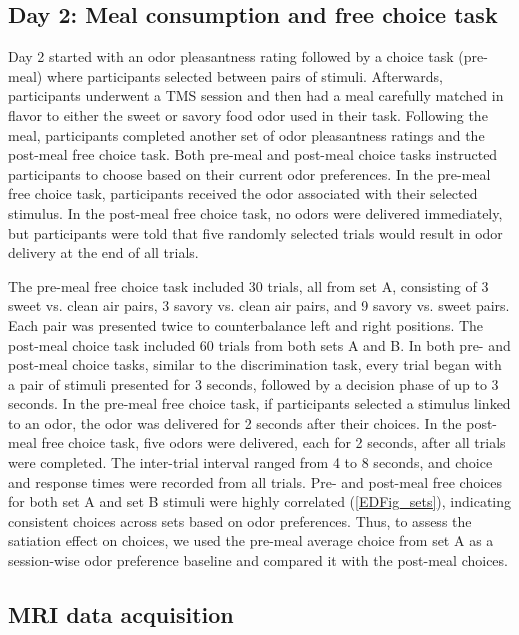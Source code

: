 \documentclass[lineno,sn-basic]{sn-jnl}%
\begin{document}
\subsection{Day 2: Meal consumption and free choice task} 
\label{day-2-meal-and-choice}

Day 2 started with an odor pleasantness rating followed by a choice task (pre-meal) where participants selected between pairs of stimuli. Afterwards, participants underwent a TMS session and then had a meal carefully matched in flavor to either the sweet or savory food odor used in their task. Following the meal, participants completed another set of odor pleasantness ratings and the post-meal free choice task. Both pre-meal and post-meal choice tasks instructed participants to choose based on their current odor preferences. In the pre-meal free choice task, participants received the odor associated with their selected stimulus. In the post-meal free choice task, no odors were delivered immediately, but participants were told that five randomly selected trials would result in odor delivery at the end of all trials.

The pre-meal free choice task included 30 trials, all from set A, consisting of 3 sweet vs. clean air pairs, 3 savory vs. clean air pairs, and 9 savory vs. sweet pairs. Each pair was presented twice to counterbalance left and right positions. The post-meal choice task included 60 trials from both sets A and B. In both pre- and post-meal choice tasks, similar to the discrimination task, every trial began with a pair of stimuli presented for 3 seconds, followed by a decision phase of up to 3 seconds. In the pre-meal free choice task, if participants selected a stimulus linked to an odor, the odor was delivered for 2 seconds after their choices. In the post-meal free choice task, five odors were delivered, each for 2 seconds, after all trials were completed. The inter-trial interval ranged from 4 to 8 seconds, and choice and response times were recorded from all trials. Pre- and post-meal free choices for both set A and set B stimuli were highly correlated (\ref{EDFig_sets}), indicating consistent choices across sets based on odor preferences. Thus, to assess the satiation effect on choices, we used the pre-meal average choice from set A as a session-wise odor preference baseline and compared it with the post-meal choices.

\subsection{MRI data acquisition} 
\label{mri-data-acquisition}
\end{document}
